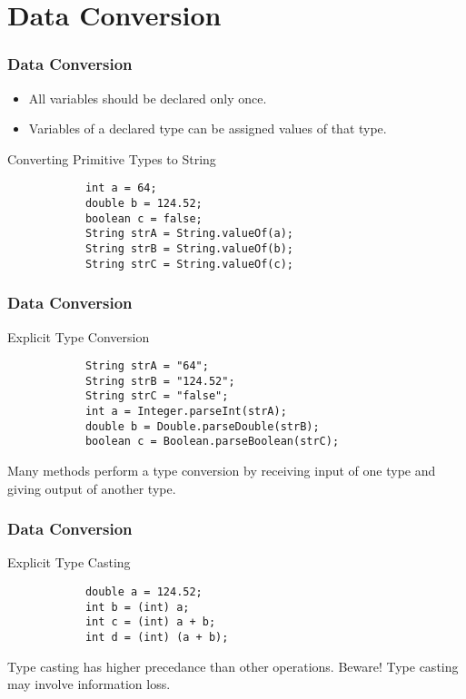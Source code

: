 \documentclass[10pt, compress]{beamer}
\begin{document}
\section{Data Conversion}

\begin{frame}[fragile]
	\frametitle{Data Conversion}
	\begin{itemize}
		\item[] All variables should be declared only once.
		\item[] Variables of a declared type can be assigned values of that type.
	\end{itemize}
	\begin{block}{Converting Primitive Types to String}
		\begin{verbatim}
			int a = 64;
			double b = 124.52;
			boolean c = false;
			String strA = String.valueOf(a);
			String strB = String.valueOf(b);
			String strC = String.valueOf(c);
		\end{verbatim}
	\end{block}
\end{frame}

\begin{frame}[fragile]
	\frametitle{Data Conversion}
	\begin{block}{Explicit Type Conversion}
		\begin{verbatim}
			String strA = "64";
			String strB = "124.52";
			String strC = "false";
			int a = Integer.parseInt(strA);
			double b = Double.parseDouble(strB);
			boolean c = Boolean.parseBoolean(strC);
		\end{verbatim}
		Many methods perform a type conversion by receiving input of one type and giving output of another type.
	\end{block}
\end{frame}

\begin{frame}[fragile]
	\frametitle{Data Conversion}
	\begin{block}{Explicit Type Casting}
		\begin{verbatim}
			double a = 124.52;
			int b = (int) a;
			int c = (int) a + b;
			int d = (int) (a + b);
		\end{verbatim}
		Type casting has higher precedance than other operations. Beware! Type casting may involve information loss.
	\end{block}
\end{frame}
\end{document}
